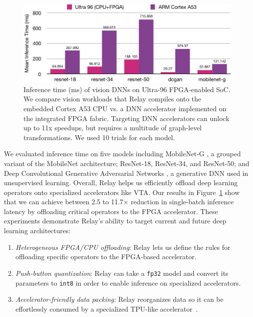  \begin{figure}[h]
    \includegraphics[width=\textwidth]{fig_splash19/eval/vision_fpga.pdf}
    \caption{
      Inference time (ms) of vision DNNs on Ultra-96 FPGA-enabled SoC.
      We compare vision workloads that Relay compiles onto the embedded Cortex
        A53 CPU vs. a DNN accelerator implemented on the integrated FPGA fabric.
      Targeting DNN accelerators can unlock up to 11x speedups, but requires a
        multitude of graph-level transformations.
      We used 10 trials for each model.
    }
    \label{fig:fpga-eval}
  \end{figure}

  We evaluated inference time on five models including MobileNet-G \citep{mobilenet}, a grouped variant of the MobileNet architecture; ResNet-18, ResNet-34, and ResNet-50\citep{resnet}; and Deep Convolutional Generative Adversarial Networks \citep{dcgan}, a generative DNN used in unsupervised learning.
  Overall, Relay helps us efficiently offload deep learning operators onto specialized accelerators like VTA.
  Our results in Figure~\ref{fig:fpga-eval} show that we can achieve between 2.5 to 11.7$\times$ reduction in single-batch inference latency by offloading critical operators to the FPGA accelerator.
  These experiments demonstrate Relay's ability to target current and future deep learning architectures:
  \begin{enumerate}
    \item \textit{Heterogeneous FPGA/CPU offloading}: Relay lets us define the rules for offloading specific operators to the FPGA-based accelerator.
    \item \textit{Push-button quantization}: Relay can take a \texttt{fp32} model and convert its parameters to \texttt{int8} in order to enable inference on specialized accelerators.
    \item \textit{Accelerator-friendly data packing:} Relay reorganizes data so it can be effortlessly consumed by a specialized TPU-like accelerator~\citep{tpuv1}.
  \end{enumerate}
